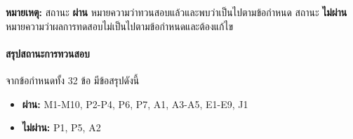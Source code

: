 \noindent\textbf{หมายเหตุ:}
สถานะ \textbf{ผ่าน} หมายความว่าทวนสอบแล้วและพบว่าเป็นไปตามข้อกำหนด
สถานะ \textbf{ไม่ผ่าน} หมายความว่าผลการทดสอบไม่เป็นไปตามข้อกำหนดและต้องแก้ไข

\paragraph{สรุปสถานะการทวนสอบ}
จากข้อกำหนดทั้ง 32 ข้อ มีข้อสรุปดังนี้
\begin{itemize}
    \item \textbf{ผ่าน:} M1-M10, P2-P4, P6, P7, A1, A3-A5, E1-E9, J1
    \item \textbf{ไม่ผ่าน:} P1, P5, A2
\end{itemize}